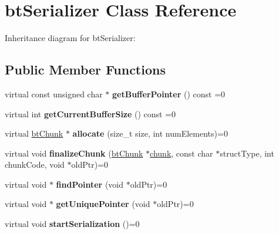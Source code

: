 \hypertarget{classbt_serializer}{\section{bt\+Serializer Class Reference}
\label{classbt_serializer}
}


Inheritance diagram for bt\+Serializer\+:
\subsection*{Public Member Functions}
\begin{DoxyCompactItemize}
\item 
\hypertarget{classbt_serializer_ab61470624eb1e6d06d7de2943d2d92d0}{virtual const unsigned char $\ast$ {\bfseries get\+Buffer\+Pointer} () const =0}\label{classbt_serializer_ab61470624eb1e6d06d7de2943d2d92d0}

\item 
\hypertarget{classbt_serializer_a49fa3c64ab1504a7a158f02c174e114f}{virtual int {\bfseries get\+Current\+Buffer\+Size} () const =0}\label{classbt_serializer_a49fa3c64ab1504a7a158f02c174e114f}

\item 
\hypertarget{classbt_serializer_a0bc96e86971e3410f66bc64bbce8ec81}{virtual \hyperlink{classbt_chunk}{bt\+Chunk} $\ast$ {\bfseries allocate} (size\+\_\+t size, int num\+Elements)=0}\label{classbt_serializer_a0bc96e86971e3410f66bc64bbce8ec81}

\item 
\hypertarget{classbt_serializer_ac98913802b276eed28d745ef422ac724}{virtual void {\bfseries finalize\+Chunk} (\hyperlink{classbt_chunk}{bt\+Chunk} $\ast$\hyperlink{structchunk}{chunk}, const char $\ast$struct\+Type, int chunk\+Code, void $\ast$old\+Ptr)=0}\label{classbt_serializer_ac98913802b276eed28d745ef422ac724}

\item 
\hypertarget{classbt_serializer_a6f0e64395af88f0a3f43bf0b4ed90a39}{virtual void $\ast$ {\bfseries find\+Pointer} (void $\ast$old\+Ptr)=0}\label{classbt_serializer_a6f0e64395af88f0a3f43bf0b4ed90a39}

\item 
\hypertarget{classbt_serializer_ab47015de46266c378ebba6329e71a5d6}{virtual void $\ast$ {\bfseries get\+Unique\+Pointer} (void $\ast$old\+Ptr)=0}\label{classbt_serializer_ab47015de46266c378ebba6329e71a5d6}

\item 
\hypertarget{classbt_serializer_a7ab4fa452564cb52eec170cc6ee9f133}{virtual void {\bfseries start\+Serialization} ()=0}\label{classbt_serializer_a7ab4fa452564cb52eec170cc6ee9f133}


\end{DoxyCompactItemize}
